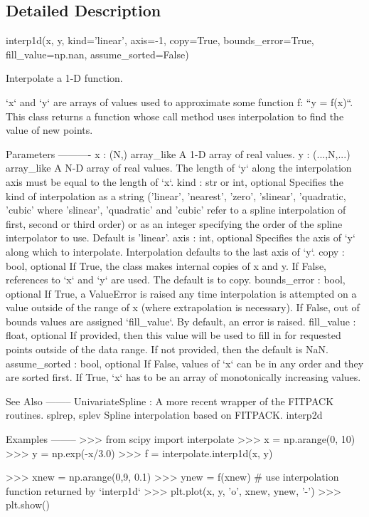 \subsection{Detailed Description}
\begin{DoxyVerb}interp1d(x, y, kind='linear', axis=-1, copy=True, bounds_error=True,
         fill_value=np.nan, assume_sorted=False)

Interpolate a 1-D function.

`x` and `y` are arrays of values used to approximate some function f:
``y = f(x)``.  This class returns a function whose call method uses
interpolation to find the value of new points.

Parameters
----------
x : (N,) array_like
    A 1-D array of real values.
y : (...,N,...) array_like
    A N-D array of real values. The length of `y` along the interpolation
    axis must be equal to the length of `x`.
kind : str or int, optional
    Specifies the kind of interpolation as a string
    ('linear', 'nearest', 'zero', 'slinear', 'quadratic, 'cubic'
    where 'slinear', 'quadratic' and 'cubic' refer to a spline
    interpolation of first, second or third order) or as an integer
    specifying the order of the spline interpolator to use.
    Default is 'linear'.
axis : int, optional
    Specifies the axis of `y` along which to interpolate.
    Interpolation defaults to the last axis of `y`.
copy : bool, optional
    If True, the class makes internal copies of x and y.
    If False, references to `x` and `y` are used. The default is to copy.
bounds_error : bool, optional
    If True, a ValueError is raised any time interpolation is attempted on
    a value outside of the range of x (where extrapolation is
    necessary). If False, out of bounds values are assigned `fill_value`.
    By default, an error is raised.
fill_value : float, optional
    If provided, then this value will be used to fill in for requested
    points outside of the data range. If not provided, then the default
    is NaN.
assume_sorted : bool, optional
    If False, values of `x` can be in any order and they are sorted first.
If True, `x` has to be an array of monotonically increasing values.


See Also
--------
UnivariateSpline : A more recent wrapper of the FITPACK routines.
splrep, splev
    Spline interpolation based on FITPACK.
interp2d

Examples
--------
>>> from scipy import interpolate
>>> x = np.arange(0, 10)
>>> y = np.exp(-x/3.0)
>>> f = interpolate.interp1d(x, y)

>>> xnew = np.arange(0,9, 0.1)
>>> ynew = f(xnew)   # use interpolation function returned by `interp1d`
>>> plt.plot(x, y, 'o', xnew, ynew, '-')
>>> plt.show()\end{DoxyVerb}
 

